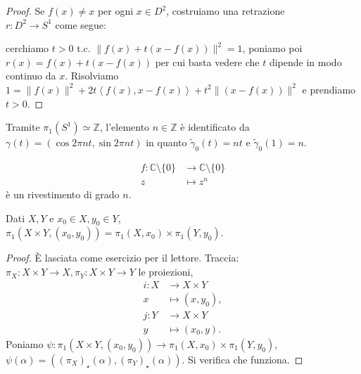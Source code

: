 \begin{proof}
  Se $f(x)\not=x$ per ogni $x \in D^2$, costruiamo una retrazione \\
  $r:D^2 \longrightarrow S^1$ come segue:
  \begin{center}
\end{center}
cerchiamo $t>0$ t.c. $\|f(x)+t(x-f(x))\|^2=1$, poniamo poi $r(x)=f(x)+t(x-f(x))$ per cui basta vedere che $t$ dipende in modo continuo da $x$. Risolviamo $1=\|f(x)\|^2+2t\left \langle f(x), x-f(x) \right \rangle+t^2\|(x-f(x))\|^2$ e prendiamo $t>0$.
\end{proof}

\begin{oss}
  Tramite $\pi_1(S^1) \simeq \mathbb{Z}$, l'elemento $n \in \mathbb{Z}$ è identificato da $\gamma(t)=(\cos{2\pi nt}, \sin{2\pi nt})$ in quanto $\tilde{\gamma}_0(t)=nt$ e $\tilde{\gamma}_0(1)=n$.
\end{oss}

\begin{exc}
  \begin{align*}
    f:\mathbb{C} \setminus \{0\} &\longrightarrow \mathbb{C} \setminus \{0\} \\
    z &\longmapsto z^n
  \end{align*}
  è un rivestimento di grado $n$.
\end{exc}

\begin{thm}
  Dati $X, Y$ e $x_0 \in X, y_0 \in Y$, \\ $\pi_1(X \times Y, (x_0, y_0))=\pi_1(X, x_0) \times \pi_1(Y, y_0)$.
\end{thm}

\begin{proof}
  È lasciata come esercizio per il lettore. Traccia: $\pi_X:X \times Y \longrightarrow X, \pi_Y:X \times Y \longrightarrow Y$ le proiezioni,
  \begin{align*}
    i:X &\longrightarrow X \times Y \\
    x &\longmapsto (x, y_0), \\
    j:Y &\longrightarrow X \times Y \\
    y &\longmapsto (x_0, y).
  \end{align*}
  Poniamo $\psi:\pi_1(X \times Y, (x_0, y_0)) \longrightarrow \pi_1(X, x_0) \times \pi_1(Y, y_0)$, $\psi(\alpha)=((\pi_X)_{\star}(\alpha), (\pi_Y)_{\star}(\alpha))$. Si verifica che funziona.
\end{proof}

